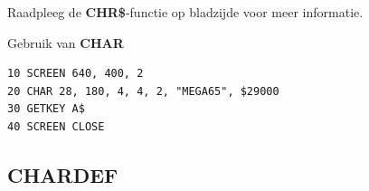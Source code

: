 \begin{description}[leftmargin=2cm,style=nextline]
                 Raadpleeg de {\bf CHR\$}-functie op bladzijde \pageref{BASIC 65 Functions!CHR} voor meer informatie.

\item [Voorbeeld:] Gebruik van {\bf CHAR}

\begin{tcolorbox}[colback=black,coltext=white]
\verbatimfont{\codefont}
\begin{verbatim}
10 SCREEN 640, 400, 2
20 CHAR 28, 180, 4, 4, 2, "MEGA65", $29000
30 GETKEY A$
40 SCREEN CLOSE
\end{verbatim}
\end{tcolorbox}
\end{description}


\newpage
\subsection{CHARDEF}
